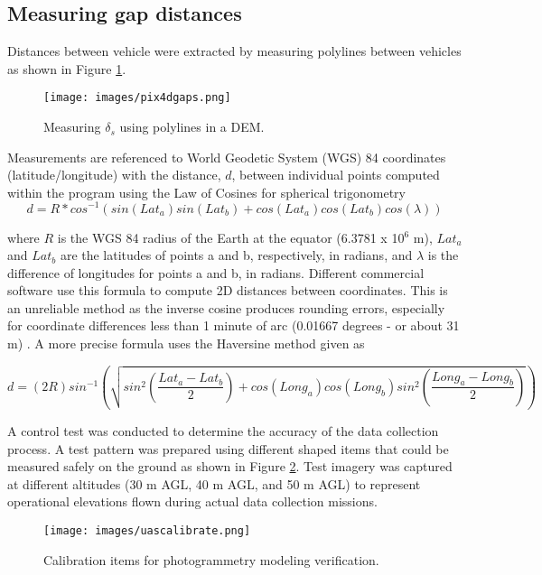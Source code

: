 \subsection{Measuring gap distances}
Distances between vehicle were extracted by measuring polylines between vehicles as shown in Figure \ref{fig:pix4Dgaps}.
%
\begin{figure}[H]
\centering
\texttt{[image: images/pix4dgaps.png]} 
\caption{Measuring $\delta_{s}$ using polylines in a DEM.}
\label{fig:pix4Dgaps}
\end{figure}
%
Measurements are referenced to World Geodetic System (WGS) 84 coordinates (latitude/longitude) with the distance, $d$, between individual points computed within the program using the Law of Cosines for spherical trigonometry \citep{Sinnott1984}
%
\begin{equation}
\label{eq:distTrig}
d = R * cos^{-1}(sin(Lat_{a})sin(Lat_{b}) + cos(Lat_{a})cos(Lat_{b})cos(\lambda))
\end{equation}

\noindent
where $R$ is the WGS 84 radius of the Earth at the equator (6.3781 x 10$^6$ m), $Lat_{a}$ and $Lat_{b}$ are the latitudes of points a and b, respectively, in radians, and $\lambda$ is the difference of longitudes for points a and b, in radians.  Different commercial software use this formula to compute 2D distances between coordinates. This is an unreliable method as the inverse cosine produces rounding errors, especially for coordinate differences less than 1 minute of arc (0.01667 degrees - or about 31 m) \citep{Sinnott1984}. A more precise formula uses the Haversine method given as 

\begin{equation}
\label{eq:distHaversine}
d = (2R)sin^{-1}\left (\sqrt{ sin^{2}\left ( \frac{Lat_{a}-Lat_{b}}{2} \right ) + cos(Long_{a})cos(Long_{b})sin^{2} \left ( \frac{Long_{a}-Long_{b}}{2} \right ) } \right )
\end{equation}

A control test was conducted to determine the accuracy of the data collection process. A test pattern was prepared using different shaped items that could be measured safely on the ground as shown in Figure \ref{fig:uascalibration}. Test imagery was captured at different altitudes (30 m AGL, 40 m AGL, and 50 m AGL) to represent operational elevations flown during actual data collection missions. 

\begin{figure}[H]
\centering
\texttt{[image: images/uascalibrate.png]} 
\caption{Calibration items for photogrammetry modeling verification.}
\label{fig:uascalibration}
\end{figure}

